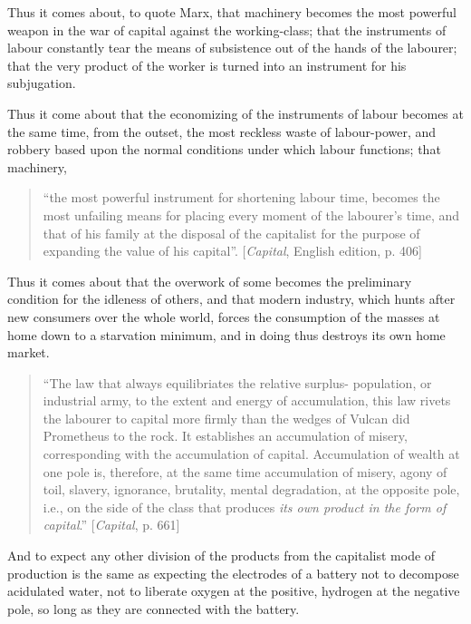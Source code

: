 Thus it comes about, to quote Marx, that machinery becomes the most powerful
weapon in the war of capital against the working-class; that the instruments of
labour constantly tear the means of subsistence out of the hands of the
labourer; that the very product of the worker is turned into an instrument for
his subjugation.

Thus it come about that the economizing of the instruments of labour becomes at
the same time, from the outset, the most reckless waste of labour-power, and
robbery based upon the normal conditions under which labour functions; that
machinery,
%
\begin{quote}
  ``the most powerful instrument for shortening labour time, becomes the most
  unfailing means for placing every moment of the labourer's time, and that of
  his family at the disposal of the capitalist for the purpose of expanding the
  value of his capital''. [\emph{Capital}, English edition, p. 406]
\end{quote}

Thus it comes about that the overwork of some becomes the preliminary condition
for the idleness of others, and that modern industry, which hunts after new
consumers over the whole world, forces the consumption of the masses at home
down to a starvation minimum, and in doing thus destroys its own home market.
%
\begin{quote}
  ``The law that always equilibriates the relative surplus- population, or
  industrial army, to the extent and energy of accumulation, this law rivets the
  labourer to capital more firmly than the wedges of Vulcan did Prometheus to
  the rock. It establishes an accumulation of misery, corresponding with the
  accumulation of capital. Accumulation of wealth at one pole is, therefore, at
  the same time accumulation of misery, agony of toil, slavery, ignorance,
  brutality, mental degradation, at the opposite pole, i.e., on the side of the
  class that produces \emph{its own product in the form of capital}.''
  [\emph{Capital}, p. 661]
\end{quote}
%
And to expect any other division of the products from the capitalist mode of
production is the same as expecting the electrodes of a battery not to decompose
acidulated water, not to liberate oxygen at the positive, hydrogen at the
negative pole, so long as they are connected with the battery.

